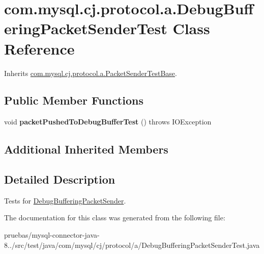 \hypertarget{classcom_1_1mysql_1_1cj_1_1protocol_1_1a_1_1_debug_buffering_packet_sender_test}{}\section{com.\+mysql.\+cj.\+protocol.\+a.\+Debug\+Buffering\+Packet\+Sender\+Test Class Reference}
\label{classcom_1_1mysql_1_1cj_1_1protocol_1_1a_1_1_debug_buffering_packet_sender_test}


Inherits \mbox{\hyperlink{classcom_1_1mysql_1_1cj_1_1protocol_1_1a_1_1_packet_sender_test_base}{com.\+mysql.\+cj.\+protocol.\+a.\+Packet\+Sender\+Test\+Base}}.

\subsection*{Public Member Functions}
\begin{DoxyCompactItemize}
\item 
\mbox{\label{classcom_1_1mysql_1_1cj_1_1protocol_1_1a_1_1_debug_buffering_packet_sender_test_a805325b46dfbe27627ffaea1cd93cdc5}} 
void {\bfseries packet\+Pushed\+To\+Debug\+Buffer\+Test} ()  throws I\+O\+Exception 
\end{DoxyCompactItemize}
\subsection*{Additional Inherited Members}


\subsection{Detailed Description}
Tests for \mbox{\hyperlink{classcom_1_1mysql_1_1cj_1_1protocol_1_1a_1_1_debug_buffering_packet_sender}{Debug\+Buffering\+Packet\+Sender}}. 

The documentation for this class was generated from the following file\+:\begin{DoxyCompactItemize}
\item 
pruebas/mysql-\/connector-\/java-\/8../src/test/java/com/mysql/cj/protocol/a/Debug\+Buffering\+Packet\+Sender\+Test.\+java\end{DoxyCompactItemize}
